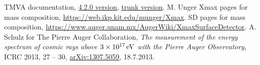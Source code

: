 \documentclass[12pt,a4paper]{report}
\begin{document}
\begin{thebibliography}{50}
 TMVA documentation, \href{https://root.cern.ch/download/doc/tmva/TMVAUsersGuide.pdf}{4.2.0 version}, \href{https://github.com/root-project/root/blob/master/documentation/tmva/UsersGuide/TMVAUsersGuide.pdf}{trunk version}.
 M. Unger Xmax pages for mass composition, \href{https://web.ikp.kit.edu/munger/Xmax}{https://web.ikp.kit.edu/munger/Xmax}.
 SD pages for mass composition, \href{https://www.auger.unam.mx/AugerWiki/XmaxSurfaceDetector}{https://www.auger.unam.mx/AugerWiki/XmaxSurfaceDetector}.
 A. Schulz for The Pierre Auger Collaboration, \emph{The measurement of the energy spectrum of cosmic rays above $\unit[3\times 10^{17}]{eV}$ with the Pierre Auger Observatory}, ICRC 2013, 27 -- 30, \href{https://arxiv.org/pdf/1307.5059.pdf}{arXiv:1307.5059}, 18.7.2013.
\end{thebibliography}
\end{document}

